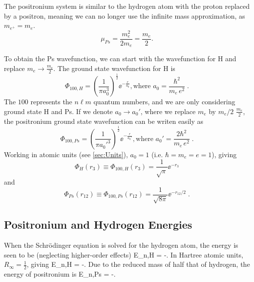 \documentclass[Dissertation.tex]{subfiles}
\begin{document}
The positronium system is similar to the hydrogen atom with the proton replaced by a positron, meaning we can no longer use the infinite mass approximation, as $m_{e^+} = m_e$.
\begin{equation}
\mu_{Ps} = \frac{m_e^2}{2 m_e} = \frac{m_e}{2}.
\end{equation}

To obtain the Ps wavefunction, we can start with the wavefunction for H and replace $m_e \rightarrow \frac{m_e}{2}$.  The ground state wavefunction for H is
\begin{equation}
\Phi_{100,H} = \left(\frac{1}{\pi a_0^3}\right)^{\frac{1}{2}} \!\! \ee^{-\frac{r}{a_0}},
\text{where } a_0 = \frac{\hbar^2}{m_e \,e^2} \;.
\end{equation}
The $100$ represents the $n \ell m$ quantum numbers, and we are only considering ground state H and Ps. 
If we denote $a_0 \rightarrow a_0'$, where we replace $m_e$ by $m_e/2$ $\frac{m_e}{2}$, the positronium ground state wavefunction can be writen easily as
\begin{equation}
\Phi_{100,Ps} = \left(\frac{1}{\pi {a_0'}^3}\right)^{\frac{1}{2}} \!\! \ee^{-\frac{r}{a_0'}},
\text{where } a_0' = \frac{2\hbar^2}{m_e \,e^2} \;.
\end{equation}
Working in atomic units (see \cref{sec:Units}), $a_0 = 1$ (i.e. $\hbar = m_e = e = 1$), giving
\begin{equation}
\Phi_H\left(r_3\right) \equiv \Phi_{100,H}\left(r_3\right) = \frac{1}{\sqrt{\pi}} \ee^{-r_3}
\label{eq:HWave}
\end{equation}
and
\begin{equation}
\Phi_{Ps}\left(r_{12}\right) \equiv \Phi_{100,Ps}\left(r_{12}\right) = \frac{1}{\sqrt{8 \pi}} \ee^{-r_{12}/2} \;.
\label{eq:PsWave}
\end{equation}

\subsection{Positronium and Hydrogen Energies}

When the Schr\"{o}dinger equation is solved for the hydrogen atom, the energy is seen to be (neglecting higher-order effects)
\beq
\label{eq:HEnergy}
E_{n,H} = -.
\eeq
In Hartree atomic units, $R_\infty = \frac{1}{2}$, giving
\beq
\label{eq:HEnergyAU}
E_{n,H} = -.
\eeq
Due to the reduced mass of half that of hydrogen, the energy of positronium is
\beq
\label{eq:PsEnergyAU}
E_{n,Ps} = -.
\eeq
\end{document}
